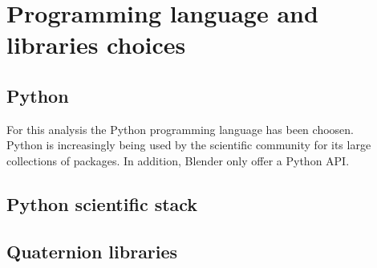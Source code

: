 \chapter{Programming language and libraries choices}
\label{chap:programming_language_libraries_choices}

\section{Python}
For this analysis the Python programming language has been choosen. \\
Python is increasingly being used by the scientific community for its large collections of packages.
In addition, Blender only offer a Python API.

\section{Python scientific stack}

\section{Quaternion libraries}

